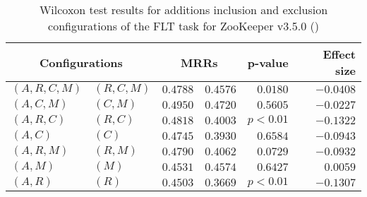 
\begin{table}
\begin{spacing}{1.2}
\centering
\caption{Wilcoxon test results for additions inclusion and exclusion configurations of the FLT task for ZooKeeper v3.5.0 (\ctwo)}
\label{table:versus-wilcox-zookeeper-flt-additions}
\begin{tabular}{ll|rr|rr}
\toprule
      \multicolumn{2}{c|}{Configurations} &                \multicolumn{2}{c|}{MRRs} &             p-value & Effect size \\
\midrule
 $(A,R,C,M)$ &  $(R,C,M)$ &  $\bm{0.4788}$ &       $0.4576$ & $0.0180$ &   $-0.0408$ \\
   $(A,C,M)$ &    $(C,M)$ &  $\bm{0.4950}$ &       $0.4720$ & $0.5605$ &   $-0.0227$ \\
   $(A,R,C)$ &    $(R,C)$ &  $\bm{0.4818}$ &       $0.4003$ & $p<0.01$ &   $-0.1322$ \\
     $(A,C)$ &      $(C)$ &  $\bm{0.4745}$ &       $0.3930$ & $0.6584$ &   $-0.0943$ \\
   $(A,R,M)$ &    $(R,M)$ &  $\bm{0.4790}$ &       $0.4062$ & $0.0729$ &   $-0.0932$ \\
     $(A,M)$ &      $(M)$ &       $0.4531$ &  $\bm{0.4574}$ & $0.6427$ &    $0.0059$ \\
     $(A,R)$ &      $(R)$ &  $\bm{0.4503}$ &       $0.3669$ & $p<0.01$ &   $-0.1307$ \\
\bottomrule
\end{tabular}

\end{spacing}
\end{table}

